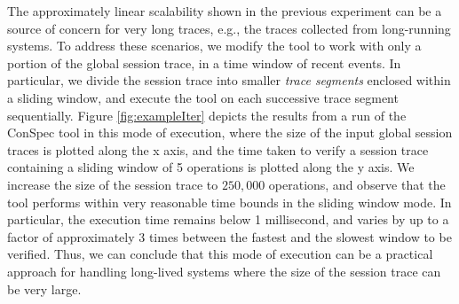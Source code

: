 \documentclass[journal,compsoc]{IEEEtran}
\begin{document}
 \par The approximately linear scalability shown in the previous experiment can be a source of concern for very long traces, e.g., the traces collected from long-running systems. To address these scenarios, we modify the tool to work with only a portion of the global session trace, in a time window of recent events. In particular, we divide the session trace into smaller \emph{trace segments} enclosed within a sliding window, and execute  the tool on  each successive trace segment sequentially.   Figure \ref{fig:exampleIter} depicts the results from a run of the ConSpec tool in this mode of execution, where the size of the input global session traces is plotted along the x axis, and the time taken to verify a session trace containing a sliding window of 5 operations is plotted along the y axis. We increase the size of the session trace to $250,000$ operations, and observe that the tool performs within very reasonable time bounds in the sliding window mode. In particular, the execution time remains below %
   1 millisecond, and varies by up to a factor of approximately 3 times between the fastest and the slowest window to be verified.   Thus, we can conclude that this mode of execution can be a practical approach for handling long-lived systems where the size of the session trace can be very large.
\end{document}
